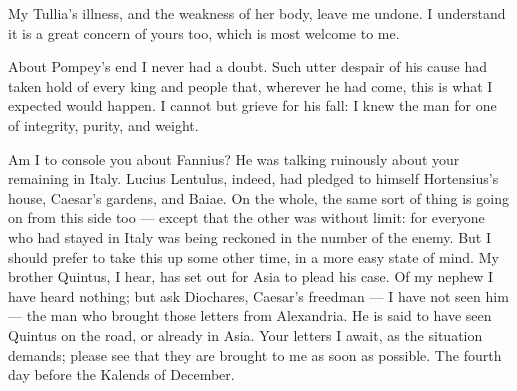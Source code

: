  My Tullia's illness, and the weakness of her body, leave me undone. I understand it is a great concern of yours too, which is most welcome to me.

 About Pompey's end I never had a doubt. Such utter despair of his cause had taken hold of every king and people that, wherever he had come, this is what I expected would happen. I cannot but grieve for his fall: I knew the man for one of integrity, purity, and weight.

 Am I to console you about Fannius? He was talking ruinously about your remaining in Italy. Lucius Lentulus, indeed, had pledged to himself Hortensius's house, Caesar's gardens, and Baiae. On the whole, the same sort of thing is going on from this side too --- except that the other was without limit: for everyone who had stayed in Italy was being reckoned in the number of the enemy. But I should prefer to take this up some other time, in a more easy state of mind. My brother Quintus, I hear, has set out for Asia to plead his case. Of my nephew I have heard nothing; but ask Diochares, Caesar's freedman --- I have not seen him --- the man who brought those letters from Alexandria. He is said to have seen Quintus on the road, or already in Asia. Your letters I await, as the situation demands; please see that they are brought to me as soon as possible. The fourth day before the Kalends of December.
